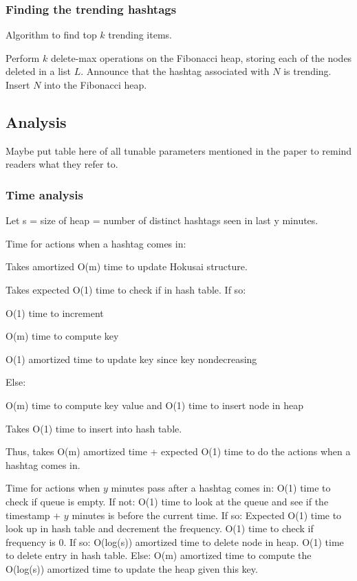 \documentclass[a4paper,12pt]{article}
\begin{document}
\subsubsection{Finding the trending hashtags}

\begin{algorithm}
\caption{Algorithm to find top $k$ trending items.}
\begin{algorithmic}[1]
\State Perform $k$ delete-max operations on the Fibonacci heap, storing each of the nodes deleted in a list $L$.
	\State Announce that the hashtag associated with $N$ is trending.
	\State Insert $N$ into the Fibonacci heap.
\EndFor
\end{algorithmic}
\end{algorithm}



\subsection{Analysis}

Maybe put table here of all tunable parameters mentioned in the paper to remind readers what they refer to.

\subsubsection{Time analysis}

Let s = size of heap = number of distinct hashtags seen in last y minutes.

Time for actions when a hashtag comes in:

	Takes amortized O(m) time to update Hokusai structure.

	Takes expected O(1) time to check if in hash table.  If so:

		O(1) time to increment

		O(m) time to compute key 

		O(1) amortized time to update key since key nondecreasing

	Else: 

		O(m) time to compute key value and O(1) time to insert node in heap

		Takes O(1) time to insert into hash table. 


Thus, takes O(m) amortized time + expected O(1) time to do the actions when a hashtag comes in.


Time for actions when $y$ minutes pass after a hashtag comes in:
	O(1) time to check if queue is empty.  If not:
		O(1) time to look at the queue and see if the timestamp + $y$ minutes is before the current time.  If so:
			Expected O(1) time to look up in hash table and decrement the frequency.
			O(1) time to check if frequency is 0.  If so:
				O(log(s)) amortized time to delete node in heap.
				O(1) time to delete entry in hash table.
			Else:
				O(m) amortized time to compute the 
				O(log(s)) amortized time to update the heap given this key.
\end{document}
